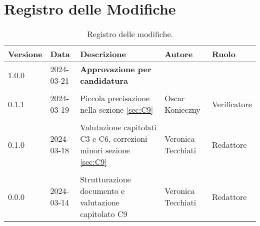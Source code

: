 \section*{Registro delle Modifiche}
\begin{table}[ht!]	
		\centering
		\begin{tabular}{p{1.2cm} p{2cm} p{6cm} p{3cm} p{2cm}}
			\toprule
			\textbf{Versione}& \textbf{Data} & \textbf{Descrizione} & \textbf{Autore} & \textbf{Ruolo} \\
			\midrule
				1.0.0 & 2024-03-21 & \textbf{Approvazione per candidatura} &  & \\\\
				0.1.1 & 2024-03-19 & Piccola precisazione nella sezione \ref{sec:C9} & Oscar Konieczny & Verificatore
				\\\\ %
                0.1.0 & 2024-03-18 & Valutazione capitolati C3 e C6, correzioni minori sezione \ref{sec:C9} & Veronica Tecchiati & Redattore 
   				\\\\ %
				0.0.0 & 2024-03-14 & Strutturazione documento e valutazione capitolato C9 & Veronica Tecchiati & Redattore \\
			\bottomrule
		\end{tabular}
		\caption{Registro delle modifiche.}
		\label{table:Registro delle modifiche}
\end{table}